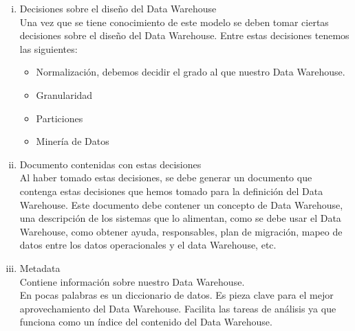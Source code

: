 \documentclass[11pt,a4paper]{article}
\begin{document}
\begin{enumerate}[A.]
\begin{enumerate}[i.]
				\item Decisiones sobre el diseño del Data Warehouse\\				
				Una vez que se tiene conocimiento de este modelo se deben tomar ciertas decisiones sobre el diseño del Data Warehouse. Entre estas decisiones tenemos las siguientes:
					\begin{itemize}
						\item Normalización, debemos decidir el grado al que nuestro Data Warehouse.
						\item Granularidad
						\item Particiones
						\item Minería de Datos\\
					\end{itemize}
				
				\item Documento contenidas con estas decisiones\\				
				Al haber tomado estas decisiones, se debe generar un documento que contenga estas decisiones que hemos tomado para la definición del Data Warehouse. Este documento debe contener un concepto de Data Warehouse, una descripción de los sistemas que lo alimentan, como se debe usar el Data Warehouse, como obtener ayuda, responsables, plan de migración, mapeo de datos entre los datos operacionales y el data Warehouse, etc.\\	
				
				\item Metadata\\
				Contiene información sobre nuestro Data Warehouse.\\
				En pocas palabras es un diccionario de datos. Es pieza clave para el mejor aprovechamiento del Data Warehouse. Facilita las tareas de análisis ya que funciona como un índice del contenido del Data Warehouse.
														

\end{enumerate}
\end{enumerate}
\end{document}
